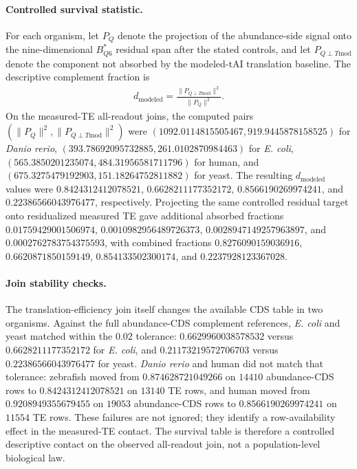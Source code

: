 \paragraph{Controlled survival statistic.}
For each organism, let $P_Q$ denote the projection of the abundance-side signal onto the nine-dimensional $B^{\ast}_{Q6}$ residual span after the stated controls, and let $P_{Q\perp T\mathrm{mod}}$ denote the component not absorbed by the modeled-tAI translation baseline.  The descriptive complement fraction is
$$
\begin{aligned}
d_{\mathrm{modeled}}=\frac{\|P_{Q\perp T\mathrm{mod}}\|^2}{\|P_Q\|^2}.
\end{aligned}
$$
On the measured-TE all-readout joins, the computed pairs $(\|P_Q\|^2,\|P_{Q\perp T\mathrm{mod}}\|^2)$ were $(1092.0114815505467,919.9445878158525)$ for \textit{Danio rerio}, $(393.78692095732885,261.0102870984463)$ for \textit{E. coli}, $(565.3850201235074,484.31956581711796)$ for human, and $(675.3275479192903,151.18264752811882)$ for yeast.  The resulting $d_{\mathrm{modeled}}$ values were $0.8424312412078521$, $0.6628211177352172$, $0.8566190269974241$, and $0.22386566043976477$, respectively.  Projecting the same controlled residual target onto residualized measured TE gave additional absorbed fractions $0.01759429001506974$, $0.0010982956489726373$, $0.0028947149257963897$, and $0.0002762783754375593$, with combined fractions $0.8276090159036916$, $0.6620871850159149$, $0.854133502300174$, and $0.2237928123367028$.

\paragraph{Join stability checks.}
The translation-efficiency join itself changes the available CDS table in two organisms.  Against the full abundance-CDS complement references, \textit{E. coli} and yeast matched within the $0.02$ tolerance: $0.6629960038578532$ versus $0.6628211177352172$ for \textit{E. coli}, and $0.21173219572706703$ versus $0.22386566043976477$ for yeast.  \textit{Danio rerio} and human did not match that tolerance: zebrafish moved from $0.874628721049266$ on $14410$ abundance-CDS rows to $0.8424312412078521$ on $13140$ TE rows, and human moved from $0.9208949355679455$ on $19053$ abundance-CDS rows to $0.8566190269974241$ on $11554$ TE rows.  These failures are not ignored; they identify a row-availability effect in the measured-TE contact.  The survival table is therefore a controlled descriptive contact on the observed all-readout join, not a population-level biological law.

